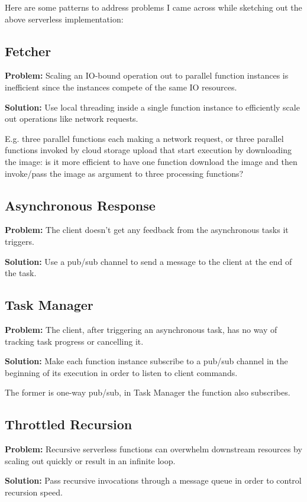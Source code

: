 Here are some patterns to address problems I came across while sketching out the above serverless implementation:

\subsection{Fetcher} \label{subsec:Fetcher}

\textbf{Problem:} Scaling an IO-bound operation out to parallel function instances is inefficient since the instances compete of the same IO resources.

\textbf{Solution:} Use local threading inside a single function instance to efficiently scale out operations like network requests.

E.g. three parallel functions each making a network request, or three parallel functions invoked by cloud storage upload that start execution by downloading the image: is it more efficient to have one function download the image and then invoke/pass the image as argument to three processing functions?

\subsection{Asynchronous Response} \label{subsec:AsyncResponse}

\textbf{Problem:} The client doesn't get any feedback from the asynchronous tasks it triggers.

\textbf{Solution:} Use a pub/sub channel to send a message to the client at the end of the task.

\subsection{Task Manager} \label{subsec:taskManager}

\textbf{Problem:} The client, after triggering an asynchronous task, has no way of tracking task progress or cancelling it.

\textbf{Solution:} Make each function instance subscribe to a pub/sub channel in the beginning of its execution in order to listen to client commands.

The former is one-way pub/sub, in Task Manager the function also subscribes.

\subsection{Throttled Recursion} \label{subsec:throttledRecursion}

\textbf{Problem:} Recursive serverless functions can overwhelm downstream resources by scaling out quickly or result in an infinite loop.

\textbf{Solution:} Pass recursive invocations through a message queue in order to control recursion speed.
